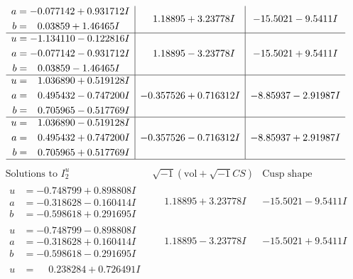 \documentclass[1p]{elsarticle_modified}
\theoremstyle{definition}
\newcommand{\I}{\sqrt{-1}}
\begin{document}
$$\begin{array}{c|c|c}
\begin{aligned}
a &= -0.077142 + 0.931712 I \\
b &= \phantom{-}0.03859 + 1.46465 I\end{aligned}
 & \phantom{-}1.18895 + 3.23778 I & -15.5021 - 9.5411 I \\ \hline\begin{aligned}
u &= -1.134110 - 0.122816 I \\
a &= -0.077142 - 0.931712 I \\
b &= \phantom{-}0.03859 - 1.46465 I\end{aligned}
 & \phantom{-}1.18895 - 3.23778 I & -15.5021 + 9.5411 I \\ \hline\begin{aligned}
u &= \phantom{-}1.036890 + 0.519128 I \\
a &= \phantom{-}0.495432 - 0.747200 I \\
b &= \phantom{-}0.705965 - 0.517769 I\end{aligned}
 & -0.357526 + 0.716312 I & -8.85937 - 2.91987 I \\ \hline\begin{aligned}
u &= \phantom{-}1.036890 - 0.519128 I \\
a &= \phantom{-}0.495432 + 0.747200 I \\
b &= \phantom{-}0.705965 + 0.517769 I\end{aligned}
 & -0.357526 - 0.716312 I & -8.85937 + 2.91987 I\\
 \hline 
 \end{array}$$\newpage$$\begin{array}{c|c|c}  
\text{Solutions to }I^u_{2}& \I (\text{vol} + \sqrt{-1}CS) & \text{Cusp shape}\\
 \hline 
\begin{aligned}
u &= -0.748799 + 0.898808 I \\
a &= -0.318628 - 0.160414 I \\
b &= -0.598618 + 0.291695 I\end{aligned}
 & \phantom{-}1.18895 + 3.23778 I & -15.5021 - 9.5411 I \\ \hline\begin{aligned}
u &= -0.748799 - 0.898808 I \\
a &= -0.318628 + 0.160414 I \\
b &= -0.598618 - 0.291695 I\end{aligned}
 & \phantom{-}1.18895 - 3.23778 I & -15.5021 + 9.5411 I \\ \hline\begin{aligned}
u &= \phantom{-}0.238284 + 0.726491 I \\

\end{aligned}
\end{array}$$
\end{document}
